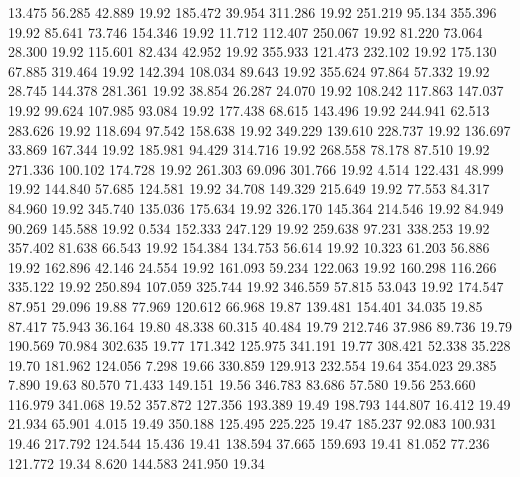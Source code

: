   13.475   56.285   42.889        19.92
 185.472   39.954  311.286        19.92
 251.219   95.134  355.396        19.92
  85.641   73.746  154.346        19.92
  11.712  112.407  250.067        19.92
  81.220   73.064   28.300        19.92
 115.601   82.434   42.952        19.92
 355.933  121.473  232.102        19.92
 175.130   67.885  319.464        19.92
 142.394  108.034   89.643        19.92
 355.624   97.864   57.332        19.92
  28.745  144.378  281.361        19.92
  38.854   26.287   24.070        19.92
 108.242  117.863  147.037        19.92
  99.624  107.985   93.084        19.92
 177.438   68.615  143.496        19.92
 244.941   62.513  283.626        19.92
 118.694   97.542  158.638        19.92
 349.229  139.610  228.737        19.92
 136.697   33.869  167.344        19.92
 185.981   94.429  314.716        19.92
 268.558   78.178   87.510        19.92
 271.336  100.102  174.728        19.92
 261.303   69.096  301.766        19.92
   4.514  122.431   48.999        19.92
 144.840   57.685  124.581        19.92
  34.708  149.329  215.649        19.92
  77.553   84.317   84.960        19.92
 345.740  135.036  175.634        19.92
 326.170  145.364  214.546        19.92
  84.949   90.269  145.588        19.92
   0.534  152.333  247.129        19.92
 259.638   97.231  338.253        19.92
 357.402   81.638   66.543        19.92
 154.384  134.753   56.614        19.92
  10.323   61.203   56.886        19.92
 162.896   42.146   24.554        19.92
 161.093   59.234  122.063        19.92
 160.298  116.266  335.122        19.92
 250.894  107.059  325.744        19.92
 346.559   57.815   53.043        19.92
 174.547   87.951   29.096        19.88
  77.969  120.612   66.968        19.87
 139.481  154.401   34.035        19.85
  87.417   75.943   36.164        19.80
  48.338   60.315   40.484        19.79
 212.746   37.986   89.736        19.79
 190.569   70.984  302.635        19.77
 171.342  125.975  341.191        19.77
 308.421   52.338   35.228        19.70
 181.962  124.056    7.298        19.66
 330.859  129.913  232.554        19.64
 354.023   29.385    7.890        19.63
  80.570   71.433  149.151        19.56
 346.783   83.686   57.580        19.56
 253.660  116.979  341.068        19.52
 357.872  127.356  193.389        19.49
 198.793  144.807   16.412        19.49
  21.934   65.901    4.015        19.49
 350.188  125.495  225.225        19.47
 185.237   92.083  100.931        19.46
 217.792  124.544   15.436        19.41
 138.594   37.665  159.693        19.41
  81.052   77.236  121.772        19.34
   8.620  144.583  241.950        19.34
